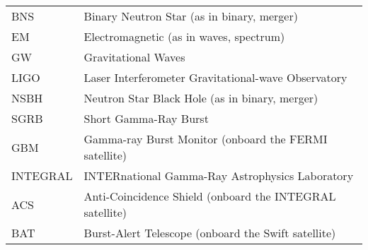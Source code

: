 \begin{longtable}[l]{l l}
    BNS & Binary Neutron Star (as in binary, merger) \\
    EM & Electromagnetic (as in waves, spectrum) \\
    GW & Gravitational Waves \\
    LIGO & Laser Interferometer Gravitational-wave Observatory \\
    NSBH & Neutron Star Black Hole (as in binary, merger) \\
    SGRB & Short Gamma-Ray Burst \\
    GBM & Gamma-ray Burst Monitor (onboard the FERMI satellite) \\
    INTEGRAL & INTERnational Gamma-Ray Astrophysics Laboratory \\
    ACS & Anti-Coincidence Shield (onboard the INTEGRAL satellite) \\
    BAT & Burst-Alert Telescope (onboard the Swift satellite) \\
\end{longtable}
